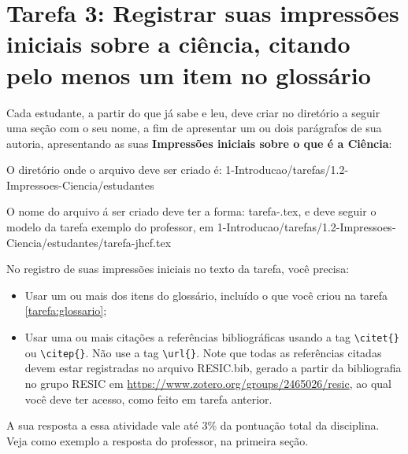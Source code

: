 \section{Tarefa 3: Registrar suas impressões iniciais sobre a ciência, citando pelo menos  um item no glossário}

Cada estudante, a partir do que já sabe e leu, deve criar no diretório a seguir uma seção com o seu nome, a fim de apresentar um ou dois parágrafos de sua autoria, apresentando as suas \textbf{Impressões iniciais sobre o que é a Ciência}: 

O diretório onde o arquivo deve ser criado é: 
1-Introducao/tarefas/1.2-Impressoes-Ciencia/estudantes

O nome do arquivo á ser criado deve ter a forma:
tarefa-\githubusername.tex, e deve seguir o modelo da tarefa exemplo do professor, em
1-Introducao/tarefas/1.2-Impressoes-Ciencia/estudantes/tarefa-jhcf.tex

No registro de suas impressões iniciais no texto da tarefa, você precisa:
\begin{itemize}
    \item Usar um ou mais dos itens do glossário, incluído o que você criou na tarefa \ref{tarefa:glossario};
    \item Usar uma ou mais citações a referências bibliográficas usando a tag \verb|\citet{}| ou \verb|\citep{}|. Não use a tag \verb|\url{}|. Note que todas as referências citadas devem estar registradas no arquivo RESIC.bib, gerado a partir da bibliografia no grupo RESIC em \url{https://www.zotero.org/groups/2465026/resic}, ao qual você deve ter acesso, como feito em tarefa anterior.
\end{itemize}

A sua resposta a essa atividade vale até 3\% da pontuação total da disciplina.
Veja como exemplo a resposta do professor, na primeira seção.


